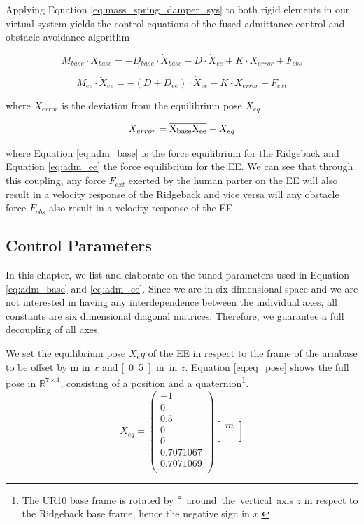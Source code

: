 Applying Equation \ref{eq:mass_spring_damper_sys} to both rigid elements in our virtual system yields the control equations of the fused admittance control and obstacle avoidance algorithm

\begin{equation}
M_{base} \cdot \ddot{X}_{base} = -D_{base} \cdot \dot{X}_{base} - D \cdot \dot{X}_{ee} + K \cdot X_{error}+F_{obs}
	\label{eq:adm_base}
\end{equation}

\begin{equation}
M_{ee} \cdot \ddot{X}_{ee} = -(D + D_{ee}) \cdot \dot{X}_{ee} - K \cdot X_{error}+F_{ext}
	\label{eq:adm_ee}
\end{equation}

where $X_{error}$ is the deviation from the equilibrium pose $X_{eq}$

\begin{equation}
X_{error} = \overline{\rm X_{base}X_{ee}} - X_{eq}
\end{equation}

where Equation \ref{eq:adm_base} is the force equilibrium for the Ridgeback and Equation \ref{eq:adm_ee} the force equilibrium for the EE. We can see that through this coupling, any force $F_{ext}$ exerted by the human parter on the EE will also result in a velocity response of the Ridgeback and vice versa will any obstacle force $F_{obs}$ also result in a velocity response of the EE.

\subsection{Control Parameters}
	\label{sec:params}
In this chapter, we list and elaborate on the tuned parameters used in Equation \ref{eq:adm_base} and \ref{eq:adm_ee}. Since we are in six dimensional space and we are not interested in having any interdependence between the individual axes, all constants are six dimensional diagonal matrices. Therefore, we guarantee a full decoupling of all axes.

We set the equilibrium pose $X_eq$ of the EE in respect to the frame of the armbase to be offset by \unit[1]{m} in $x$ and \unit[0.5]{m} in $z$. Equation \ref{eq:eq_pose} shows the full pose in $\mathbb{R}^{7 \times 1}$, consisting of a position and a quaternion\footnote{The UR10 base frame is rotated by \unit[180]{$\degree$} around the vertical axis $z$ in respect to the Ridgeback base frame, hence the negative sign in $x$.}.
\begin{equation}
X_{eq} = \begin{pmatrix}
-1 \\ 0 \\ 0.5 \\ 0 \\ 0 \\ 0.7071067 \\ 0.7071069 \\
\end{pmatrix} \begin{bmatrix}
m \\
- \\
\end{bmatrix}
	\label{eq:eq_pose}
\end{equation}

